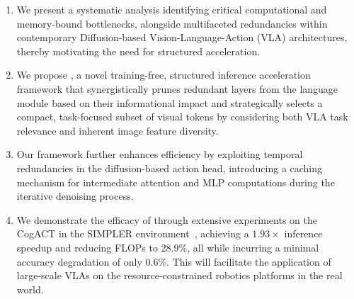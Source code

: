 \begin{enumerate}[leftmargin=10pt, topsep=0pt, itemsep=1pt, partopsep=1pt, parsep=1pt]
    \item We present a systematic analysis identifying critical computational and memory-bound bottlenecks, alongside multifaceted redundancies within contemporary Diffusion-based Vision-Language-Action (VLA) architectures, thereby motivating the need for structured acceleration.

    \item We propose \emph{\textbf{\mymethod{}}}, a novel training-free, structured inference acceleration framework that synergistically prunes redundant layers from the language module based on their informational impact and strategically selects a compact, task-focused subset of visual tokens by considering both VLA task relevance and inherent image feature diversity.

    \item Our framework further enhances efficiency by exploiting temporal redundancies in the diffusion-based action head, introducing a caching mechanism for intermediate attention and MLP computations during the iterative denoising process.

    \item We demonstrate the efficacy of \mymethod{} through extensive experiments on the CogACT in the SIMPLER environment~\citep{li2024evaluating}, achieving a $1.93\times$ inference speedup and reducing FLOPs to $28.9\%$, all while incurring a minimal accuracy degradation of only $0.6\%$. This will facilitate the application of large-scale VLAs on the resource-constrained robotics platforms in the real world. 
\end{enumerate}




